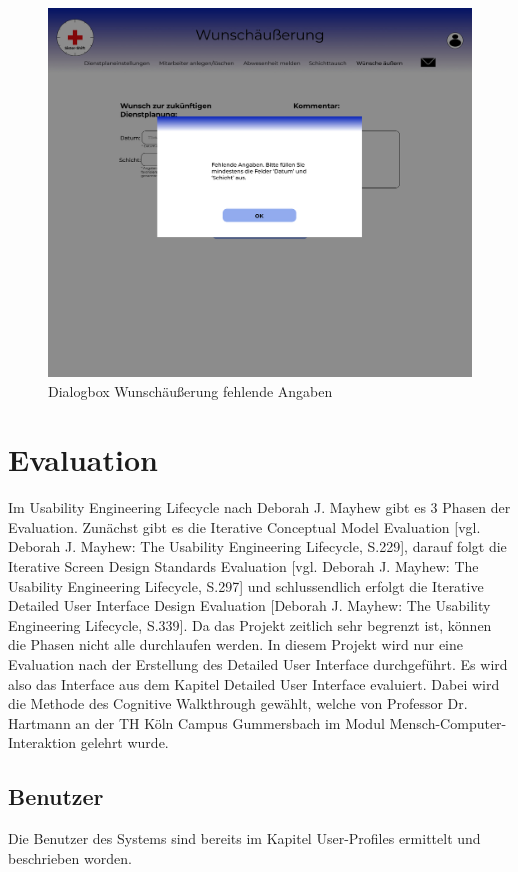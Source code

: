 \documentclass[11pt,
paper=a4,
bibtotocnumbered,	  %
liststotocnumbered,  %
DIV=calc,		  %
tablecaptionabove,	  %
headinclude,
]{article}
\begin{document}
\begin{figure}[H]
\includegraphics[width=1\textwidth]{Bilder/Screens/Wunschaeusserung-2.jpg}{\centering}
\caption{Dialogbox Wunschäußerung fehlende Angaben}
\end{figure}
\section{Evaluation}
Im Usability Engineering Lifecycle nach Deborah J. Mayhew gibt es 3 Phasen der Evaluation. Zunächst gibt es die Iterative Conceptual Model Evaluation [vgl. Deborah J. Mayhew: The Usability Engineering Lifecycle, S.229], darauf folgt die Iterative Screen Design Standards Evaluation [vgl. Deborah J. Mayhew: The Usability Engineering Lifecycle, S.297] und schlussendlich erfolgt die Iterative Detailed User Interface Design Evaluation [Deborah J. Mayhew: The Usability Engineering Lifecycle, S.339]. Da das Projekt zeitlich sehr begrenzt ist, können die Phasen nicht alle durchlaufen werden. In diesem Projekt wird nur eine Evaluation nach der Erstellung des Detailed User Interface durchgeführt. Es wird also das Interface aus dem Kapitel Detailed User Interface evaluiert. Dabei wird die Methode des Cognitive Walkthrough gewählt, welche von Professor Dr. Hartmann an der TH Köln Campus Gummersbach im Modul Mensch-Computer-Interaktion gelehrt wurde. 
\subsection{Benutzer}
Die Benutzer des Systems sind bereits im Kapitel User-Profiles ermittelt und beschrieben worden.
\end{document}
